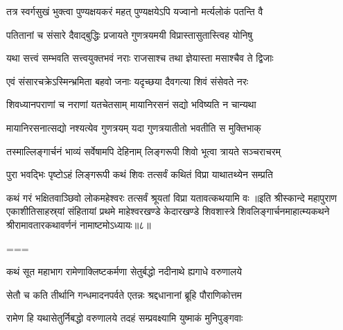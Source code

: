 \twolineshloka
{तत्र स्वर्गसुखं भुक्त्वा पुण्यक्षयकरं महत्}
{पुण्यक्षयेऽपि यज्वानो मर्त्यलोकं पतन्ति वै}%

\twolineshloka
{पतितानां च संसारे दैवाद्बुद्धिः प्रजायते}
{गुणत्रयमयी विप्रास्तासुतास्त्विह योनिषु}%

\twolineshloka
{यथा सत्त्वं सम्भवति सत्त्वयुक्तभवं नराः}
{राजसाश्च तथा ज्ञेयास्ता मसाश्चैव ते द्विजाः}%

\twolineshloka
{एवं संसारचक्रेऽस्मिन्भ्रमिता बहवो जनाः}
{यदृच्छया दैवगत्या शिवं संसेवते नरः}%

\twolineshloka
{शिवध्यानपराणां च नराणां यतचेतसाम्}
{मायानिरसनं सद्यो भविष्यति न चान्यथा}%

\twolineshloka
{मायानिरसनात्सद्यो नश्यत्येव गुणत्रयम्}
{यदा गुणत्रयातीतो भवतीति स मुक्तिभाक्}%

\twolineshloka
{तस्माल्लिङ्गार्चनं भाव्यं सर्वेषामपि देहिनाम्}
{लिङ्गरूपी शिवो भूत्वा त्रायते सञ्चराचरम्}%

\twolineshloka
{पुरा भवद्भिः पृष्टोऽहं लिङ्गरूपी कथं शिवः}
{तत्सर्वं कथितं विप्रा याथातथ्येन सम्प्रति}%

\twolineshloka
{कथं गरं भक्षितवाञ्छिवो लोकमहेश्वरः}
{तत्सर्वं श्रूयतां विप्रा यतावत्कथयामि वः}%
॥इति श्रीस्कान्दे महापुराण एकाशीतिसाहस्र्यां संहितायां प्रथमे माहेश्वरखण्डे केदारखण्डे शिवशास्त्रे शिवलिङ्गार्चनमाहात्म्यकथने श्रीरामावतारकथावर्णनं नामाष्टमोऽध्यायः॥८॥

===


\vakta{}
\shrota{}
\tags{}
\notes{}

\storymeta





\twolineshloka
{कथं सूत महाभाग रामेणाक्लिष्टकर्मणा}
{सेतुर्बद्धो नदीनाथे ह्यगाधे वरुणालये}%

\twolineshloka
{सेतौ च कति तीर्थानि गन्धमादनपर्वते}
{एतन्नः श्रद्दधानानां ब्रूहि पौराणिकोत्तम}%


\twolineshloka
{रामेण हि यथासेतुर्निबद्धो वरुणालये}
{तदहं सम्प्रवक्ष्यामि युष्माकं मुनिपुङ्गवाः}%

